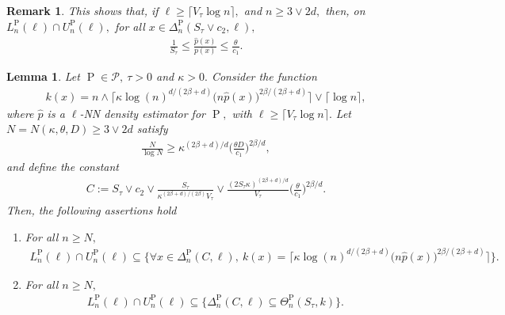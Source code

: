 \documentclass[10pt]{article}
\newcommand{\mP}{\mathcal{P}}
\renewcommand{\P}{\operatorname{P}}
\renewcommand{\k}{\kappa}
\newcommand{\wh}{\widehat}
\newtheorem{lemma}[theorem]{Lemma}
\newtheorem{remark}[theorem]{Remark}
\begin{document}
\begin{remark}
    This shows that, if $\ell \geq \lceil V_\tau\log n\rceil,$ and $n\geq 3\vee 2d,$ then, on $L_n^{\P}(\ell) \cap U_n^{\P}(\ell),$ for all $x \in \Delta_n^{\P}(S_\tau\vee c_2, \ell),$
    \begin{align*}
        \frac{1}{S_\tau} \leq \frac{\wh p(x)}{p(x)}\leq \frac{\theta}{c_1}.
    \end{align*}
\end{remark}
\begin{lemma}
    \label{lem.inclusions}
    Let $\P \in \mP,\ \tau > 0$ and $\k > 0.$ Consider the function
    \begin{align*}
        k(x) = n \wedge \Big\lceil\k\log(n)^{d/(2\beta + d)}\big(n\wh p(x)\big)^{2\beta/(2\beta + d)} \Big\rceil \vee \lceil \log n\rceil, 
    \end{align*}
    where $\wh p$ is a $\ell$-NN density estimator for $\P,$ with $\ell \geq \lceil V_\tau\log n\rceil.$ Let $N = N(\k, \theta, D) \geq 3\vee 2d$ satisfy
    \begin{align*}
        \frac N{\log N} \geq \k^{(2\beta + d)/d}\bigg(\frac{\theta D}{c_1}\bigg)^{2\beta/d},
    \end{align*}
    and define the constant
    \begin{align*}
        C := S_\tau\vee c_2 \vee \frac{S_\tau}{\k^{(2\beta + d)/(2\beta)}V_\tau} \vee \frac{(2S_\tau\k)^{(2\beta + d)/d}}{V_\tau}\bigg(\frac{\theta}{c_1}\bigg)^{2\beta/d}.
    \end{align*}
    Then, the following assertions hold
    \begin{enumerate}
        \item [$(i)$] For all $n \geq N,$ 
            \begin{align*}
                L_n^{\P}(\ell)\cap U_n^{\P}(\ell) \subseteq \Bigg\{\forall x \in \Delta_n^{\P}(C, \ell), \ k(x) = \Big\lceil\k\log(n)^{d/(2\beta + d)}\big(n\wh p(x)\big)^{2\beta/(2\beta + d)}\Big\rceil\Bigg\}.
            \end{align*}
        \item [$(ii)$] For all $n \geq N,$
            \begin{align*}
                 L_n^{\P}(\ell)\cap U_n^{\P}(\ell) \subseteq \Bigg\{\Delta_n^{\P}(C, \ell) \subseteq \Theta_n^{\P}(S_\tau, k)\Bigg\}.
            \end{align*}
    \end{enumerate}
\end{lemma}
\end{document}
